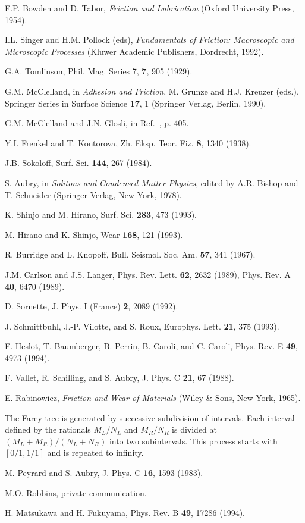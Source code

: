 \begin{references}
F.P. Bowden and D. Tabor, {\it Friction and Lubrication} (Oxford
University Press, 1954).

I.L. Singer and H.M. Pollock (eds), {\it Fundamentals of Friction:
Macroscopic and Microscopic Processes} (Kluwer Academic Publishers,
Dordrecht, 1992).

G.A. Tomlinson, Phil. Mag. Series 7, {\bf 7}, 905 (1929).

G.M. McClelland, in {\it Adhesion and Friction}, M. Grunze and H.J.
Kreuzer (eds.), Springer Series in Surface Science {\bf 17}, 1
(Springer Verlag, Berlin, 1990).

G.M. McClelland and J.N. Glosli, in Ref.~, p. 405.

Y.I. Frenkel and T. Kontorova, Zh. Eksp. Teor. Fiz. {\bf 8}, 1340 
(1938).

J.B. Sokoloff, Surf. Sci. {\bf 144}, 267 (1984).

  S. Aubry, in  {\it Solitons and Condensed Matter Physics}, edited by
  A.R. Bishop and T. Schneider (Springer-Verlag, New York, 1978).

K. Shinjo and M. Hirano, Surf. Sci. {\bf 283}, 473 (1993).

M. Hirano and K. Shinjo, Wear {\bf 168}, 121 (1993).

R. Burridge and L. Knopoff, Bull. Seismol. Soc. Am. {\bf 57}, 341 
(1967).

J.M. Carlson and J.S. Langer, Phys. Rev. Lett. {\bf 62}, 2632 (1989), 
Phys. Rev. A {\bf 40}, 6470 (1989).

D. Sornette, J. Phys. I (France) {\bf 2}, 2089 (1992).

J. Schmittbuhl, J.-P. Vilotte, and S. Roux, Europhys. Lett. {\bf 21},
375 (1993).

F. Heslot, T. Baumberger, B. Perrin, B. Caroli, and C. Caroli, Phys.
Rev. E {\bf 49}, 4973 (1994).

F. Vallet, R. Schilling, and S. Aubry, J. Phys. C {\bf 21}, 67 (1988).

E. Rabinowicz, {\it Friction and Wear of Materials} (Wiley \&
Sons, New York, 1965).

The Farey tree is generated by successive subdivision of intervals.
Each interval defined by the rationals $M_L/N_L$ and $M_R/N_R$ is
divided  at $(M_L+M_R)/(N_L+N_R)$ into two subintervals. This process
starts with $[0/1,1/1]$ and is repeated to infinity.

M. Peyrard and S. Aubry, J. Phys. C {\bf 16}, 1593 (1983).

M.O. Robbins, private communication.

H. Matsukawa and H. Fukuyama, Phys. Rev. B {\bf 49}, 17286 (1994).

\end{references}

